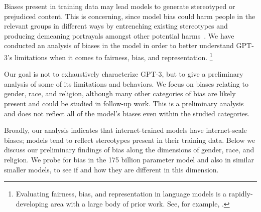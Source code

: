  Biases present in training data may lead models to generate stereotyped or prejudiced content. This is concerning, since model bias could harm people in the relevant groups in different ways by entrenching existing stereotypes and producing demeaning portrayals amongst other potential harms~\cite{youtube}. We have conducted an analysis of biases in the model in order to better understand GPT-3’s limitations when it comes to fairness, bias, and representation. \footnote{Evaluating fairness, bias, and representation in language models is a rapidly-developing area with a large body of prior work. See, for example, \cite{huang2019reducing, nadeem2020stereoset, sheng2019woman}.}
 

Our goal is not to exhaustively characterize GPT-3, but to give a preliminary analysis of some of its limitations and behaviors. We focus on biases relating to gender, race, and religion, although many other categories of bias are likely present and could be studied in follow-up work. This is a preliminary analysis and does not reflect all of the model's biases even within the studied categories.

Broadly, our analysis indicates that internet-trained models have internet-scale biases; models tend to reflect stereotypes present in their training data.  Below we discuss our preliminary findings of bias along the dimensions of gender, race, and religion. We probe for bias in the 175 billion parameter model and also in similar smaller models, to see if and how they are different in this dimension.

